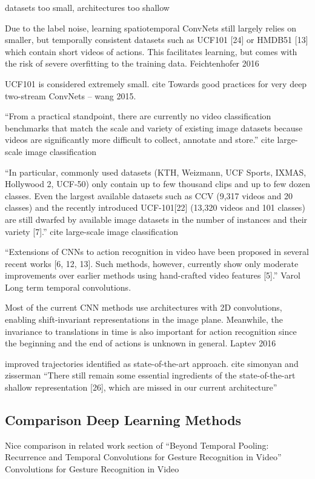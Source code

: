 datasets too small, architectures too shallow \cite{wang_towards_2015}

Due to the label noise, learning spatiotemporal ConvNets still largely relies on smaller, but temporally consistent datasets such as UCF101 [24] or HMDB51 [13] which contain short videos of actions.
This facilitates learning, but comes with the risk of severe overfitting to the training data. Feichtenhofer 2016

UCF101 is considered extremely small. cite Towards good practices for very deep two-stream ConvNets -- wang 2015.

``From a practical standpoint, there are currently no video classification benchmarks that match the scale and variety of existing image datasets because videos are significantly more difficult to collect, annotate and store.'' cite large-scale image classification

``In particular, commonly used datasets (KTH, Weizmann, UCF Sports, IXMAS, Hollywood 2, UCF-50) only contain up to few thousand clips and up to few dozen classes.
Even the largest available datasets such as CCV (9,317 videos and 20 classes) and the recently introduced UCF-101[22] (13,320 videos and 101 classes) are still dwarfed by available image datasets in the number of instances and their variety [7].'' cite large-scale image classification

``Extensions of CNNs to action recognition in video have been proposed in several recent works [6, 12, 13]. Such methods, however, currently show only moderate improvements over earlier methods using hand-crafted video features [5].''
Varol Long term temporal convolutions.

Most of the current CNN methods use architectures with 2D convolutions, enabling shift-invariant representations in the image plane. Meanwhile, the invariance to translations in time is also important for action recognition since the beginning and the end of actions is unknown in general. Laptev 2016

improved trajectories identified as state-of-the-art approach. cite simonyan and zisserman ``There still remain some essential ingredients of the state-of-the-art shallow representation [26], which are missed in our current architecture''

\subsection{Comparison Deep Learning Methods}
Nice comparison in related work section of ``Beyond Temporal Pooling:  Recurrence and Temporal Convolutions for Gesture Recognition in Video''
Convolutions for Gesture Recognition in Video

